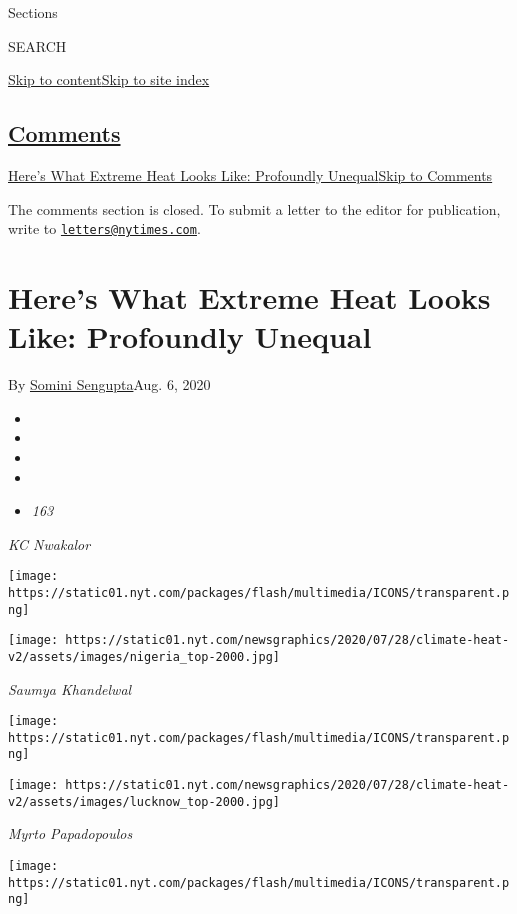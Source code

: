 Sections

SEARCH

\protect\hyperlink{site-content}{Skip to
content}\protect\hyperlink{site-index}{Skip to site index}

\hypertarget{comments}{%
\subsection{\texorpdfstring{\protect\hyperlink{commentsContainer}{Comments}}{Comments}}\label{comments}}

\href{}{Here's What Extreme Heat Looks Like: Profoundly
Unequal}\href{}{Skip to Comments}

The comments section is closed. To submit a letter to the editor for
publication, write to
\href{mailto:letters@nytimes.com}{\nolinkurl{letters@nytimes.com}}.

\hypertarget{heres-what-extreme-heat-looks-like-profoundly-unequal}{%
\section{Here's What Extreme Heat Looks Like: Profoundly
Unequal}\label{heres-what-extreme-heat-looks-like-profoundly-unequal}}

By \href{https://www.nytimes.com/by/somini-sengupta}{Somini
Sengupta}Aug. 6, 2020

\begin{itemize}
\item
\item
\item
\item
\item
  \emph{163}
\end{itemize}

\emph{KC Nwakalor}

\texttt{[image: https://static01.nyt.com/packages/flash/multimedia/ICONS/transparent.png]}

\texttt{[image: https://static01.nyt.com/newsgraphics/2020/07/28/climate-heat-v2/assets/images/nigeria\_top-2000.jpg]}

\emph{Saumya Khandelwal}

\texttt{[image: https://static01.nyt.com/packages/flash/multimedia/ICONS/transparent.png]}

\texttt{[image: https://static01.nyt.com/newsgraphics/2020/07/28/climate-heat-v2/assets/images/lucknow\_top-2000.jpg]}

\emph{Myrto Papadopoulos}

\texttt{[image: https://static01.nyt.com/packages/flash/multimedia/ICONS/transparent.png]}

